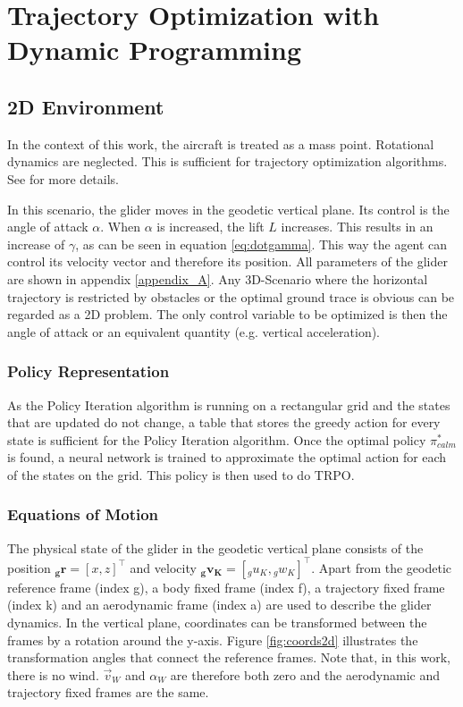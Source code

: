 \chapter{Trajectory Optimization with Dynamic Programming}
\label{chapter5}
\section{2D Environment}

In the context of this work, the aircraft is treated as a mass point. Rotational dynamics are neglected. This is sufficient for trajectory optimization algorithms. See \cite{Fichter2009} for more details. 


In this scenario, the glider moves in the geodetic vertical plane. Its control is the angle of attack $\alpha$. When $\alpha$ is increased, the lift $L$ increases. This results in an increase of $\gamma$, as can be seen in equation \ref{eq:dotgamma}. This way the agent can control its velocity vector and therefore its position. All parameters of the glider are shown in appendix \ref{appendix_A}. Any 3D-Scenario where the horizontal trajectory is restricted by obstacles or the optimal ground trace is obvious can be regarded as a 2D problem. The only control variable to be optimized is then the angle of attack or an equivalent quantity (e.g. vertical acceleration).

\subsection{Policy Representation}

As the Policy Iteration algorithm is running on a rectangular grid and the states that are updated do not change, a table that stores the greedy action for every state is sufficient for the Policy Iteration algorithm. Once the optimal policy $\pi_{calm}^*$ is found, a neural network is trained to approximate the optimal action for each of the states on the grid. This policy is then used to do TRPO.

\subsection{Equations of Motion}

The physical state of the glider in the geodetic vertical plane consists of the position $\boldsymbol{{}_g r}=[x,z]^\top$ and velocity $\boldsymbol{{}_g v_K}=[{}_g u_K,{}_g w_K]^\top$. Apart from the geodetic reference frame (index g), a body fixed frame (index f), a trajectory fixed frame (index k) and an aerodynamic frame (index a) are used to describe the glider dynamics. In the vertical plane, coordinates can be transformed between the frames by a rotation around the y-axis. Figure \ref{fig:coords2d} illustrates the transformation angles that connect the reference frames. Note that, in this work, there is no wind. $\vec{v}_W$ and $\alpha_W$ are therefore both zero and the aerodynamic and trajectory fixed frames are the same.

